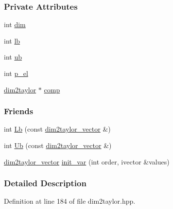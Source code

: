 \subsubsection*{\-Private \-Attributes}
\begin{DoxyCompactItemize}
\item 
int \hyperlink{classtaylor_1_1dim2taylor__vector_ad0142b9b4011a426806f09f16217c443}{dim}
\item 
int \hyperlink{classtaylor_1_1dim2taylor__vector_a2ba35c1941839c74ae6e29477df56163}{lb}
\item 
int \hyperlink{classtaylor_1_1dim2taylor__vector_a5a1d2347123e0bbc823b57a8d6f4d74c}{ub}
\item 
int \hyperlink{classtaylor_1_1dim2taylor__vector_abf767a36fd0b0fc7658b018cb1a29e55}{p\-\_\-el}
\item 
\hyperlink{classtaylor_1_1dim2taylor}{dim2taylor} $\ast$ \hyperlink{classtaylor_1_1dim2taylor__vector_a8637ab0d24f55f1b12f1a8f1dad4b060}{comp}
\end{DoxyCompactItemize}
\subsubsection*{\-Friends}
\begin{DoxyCompactItemize}
\item 
int \hyperlink{classtaylor_1_1dim2taylor__vector_a3a0c947d6ba6d21c0c3a138374bcc1d2}{\-Lb} (const \hyperlink{classtaylor_1_1dim2taylor__vector}{dim2taylor\-\_\-vector} \&)
\item 
int \hyperlink{classtaylor_1_1dim2taylor__vector_a244dd4344cb4e7855d21074ba9547ba2}{\-Ub} (const \hyperlink{classtaylor_1_1dim2taylor__vector}{dim2taylor\-\_\-vector} \&)
\item 
\hyperlink{classtaylor_1_1dim2taylor__vector}{dim2taylor\-\_\-vector} \hyperlink{classtaylor_1_1dim2taylor__vector_a176a606e5decd07956a85715c2d84b54}{init\-\_\-var} (int order, ivector \&values)
\end{DoxyCompactItemize}


\subsubsection{\-Detailed \-Description}


\-Definition at line 184 of file dim2taylor.\-hpp.



